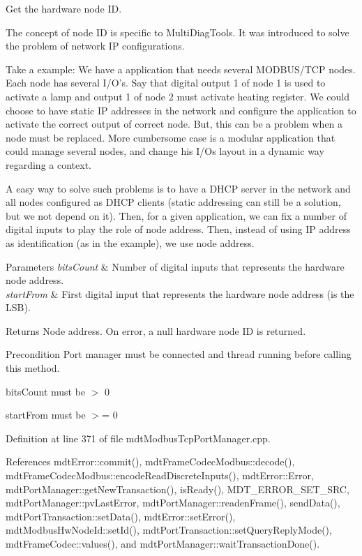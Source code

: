 Get the hardware node I\-D. 

The concept of node I\-D is specific to Multi\-Diag\-Tools. It was introduced to solve the problem of network I\-P configurations.

Take a example\-: We have a application that needs several M\-O\-D\-B\-U\-S/\-T\-C\-P nodes. Each node has several I/\-O's. Say that digital output 1 of node 1 is used to activate a lamp and output 1 of node 2 must activate heating register. We could choose to have static I\-P addresses in the network and configure the application to activate the correct output of correct node. But, this can be a problem when a node must be replaced. More cumbersome case is a modular application that could manage several nodes, and change his I/\-Os layout in a dynamic way regarding a context.

A easy way to solve such problems is to have a D\-H\-C\-P server in the network and all nodes configured as D\-H\-C\-P clients (static addressing can still be a solution, but we not depend on it). Then, for a given application, we can fix a number of digital inputs to play the role of node address. Then, instead of using I\-P address as identification (as in the example), we use node address.


\begin{DoxyParams}{Parameters}
{\em bits\-Count} & Number of digital inputs that represents the hardware node address. \\
\hline
{\em start\-From} & First digital input that represents the hardware node address (is the L\-S\-B). \\
\hline
\end{DoxyParams}
\begin{DoxyReturn}{Returns}
Node address. On error, a null hardware node I\-D is returned. 
\end{DoxyReturn}
\begin{DoxyPrecond}{Precondition}
Port manager must be connected and thread running before calling this method. 

bits\-Count must be $>$ 0 

start\-From must be $>$= 0 
\end{DoxyPrecond}


Definition at line 371 of file mdt\-Modbus\-Tcp\-Port\-Manager.\-cpp.



References mdt\-Error\-::commit(), mdt\-Frame\-Codec\-Modbus\-::decode(), mdt\-Frame\-Codec\-Modbus\-::encode\-Read\-Discrete\-Inputs(), mdt\-Error\-::\-Error, mdt\-Port\-Manager\-::get\-New\-Transaction(), is\-Ready(), M\-D\-T\-\_\-\-E\-R\-R\-O\-R\-\_\-\-S\-E\-T\-\_\-\-S\-R\-C, mdt\-Port\-Manager\-::pv\-Last\-Error, mdt\-Port\-Manager\-::readen\-Frame(), send\-Data(), mdt\-Port\-Transaction\-::set\-Data(), mdt\-Error\-::set\-Error(), mdt\-Modbus\-Hw\-Node\-Id\-::set\-Id(), mdt\-Port\-Transaction\-::set\-Query\-Reply\-Mode(), mdt\-Frame\-Codec\-::values(), and mdt\-Port\-Manager\-::wait\-Transaction\-Done().



